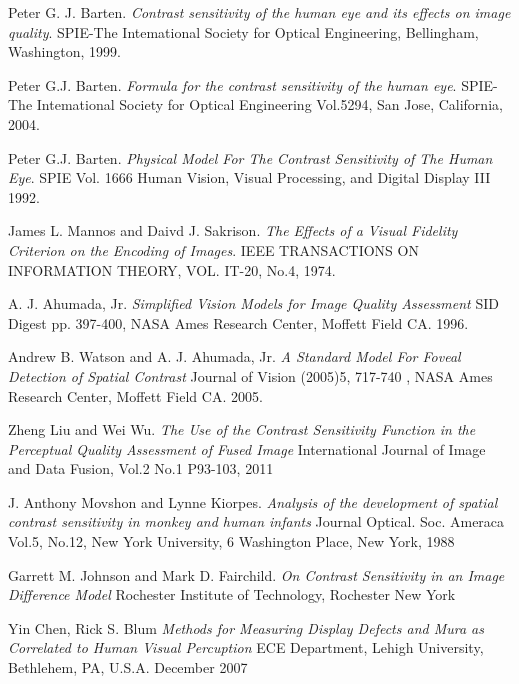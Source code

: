 \documentclass{article}
\begin{document}
\clearpage
\begin{thebibliography}{8}
Peter G. J. Barten.
\textit{Contrast sensitivity of the human eye and its effects on image quality}.
SPIE-The Intemational Society for Optical Engineering, Bellingham, Washington, 1999.

Peter G.J. Barten.
\textit{Formula for the contrast sensitivity of the human eye}.
SPIE-The Intemational Society for Optical Engineering Vol.5294, San Jose, California, 2004.

Peter G.J. Barten.
\textit{Physical Model For The Contrast Sensitivity of The Human Eye}.
SPIE Vol. 1666 Human Vision, Visual Processing, and Digital Display III 1992.

James L. Mannos and Daivd J. Sakrison.
\textit{The Effects of a Visual Fidelity Criterion on the Encoding of Images}.
IEEE TRANSACTIONS ON INFORMATION THEORY, VOL. IT-20, No.4, 1974.

A. J. Ahumada, Jr.
\textit{Simplified Vision Models for Image Quality Assessment}
SID Digest pp. 397-400, NASA Ames Research Center, Moffett Field CA. 1996.

Andrew B. Watson and A. J. Ahumada, Jr.
\textit{A Standard Model For Foveal Detection of Spatial Contrast}
Journal of Vision (2005)5, 717-740 , NASA Ames Research Center, Moffett Field CA. 2005.

Zheng Liu and Wei Wu.
\textit{The Use of the Contrast Sensitivity Function in the Perceptual Quality Assessment of Fused Image}
International Journal of Image and Data Fusion, Vol.2 No.1 P93-103, 2011

J. Anthony Movshon and Lynne Kiorpes.
\textit{Analysis of the development of spatial contrast sensitivity in monkey and human infants}
Journal Optical. Soc. Ameraca Vol.5, No.12, New York University, 6 Washington Place, New York, 1988

Garrett M. Johnson and Mark D. Fairchild.
\textit{On Contrast Sensitivity in an Image Difference Model}
Rochester Institute of Technology, Rochester New York

Yin Chen, Rick S. Blum
\textit{Methods for Measuring Display Defects and Mura as Correlated to Human Visual Percuption}
ECE Department, Lehigh University, Bethlehem, PA, U.S.A. December 2007

\end{thebibliography}
\end{document}
